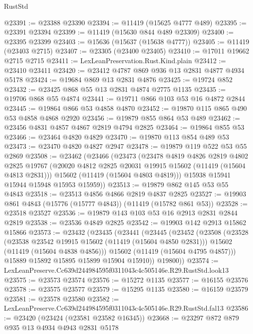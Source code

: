 \begin{lexlean}{RustStd}
\begin{coremodule}
@23391 := @23388 @23390
@23394 := @11419 (@15625 @4777 @489)
@23395 := @23391 @23394
@23399 := @11419 (@15630 @844 @489 @23309)
@23400 := @23395 @23399
@23403 := @15636 (@15637 (@15638 @4777))
@23405 := @11419 (@23403 @2715)
@23407 := @23305 (@23400 @23405)
@23410 := @17011 @19662 @2715 @2715
@23411 := LexLeanPreservation.Rust.Kind.plain
@23412 := @23410 @23411
@23420 := @23412 @4787 @869 @936 @13 @2831 @4877 @4934 @5178
@23424 := @19684 @869 @13 @2831 @4876
@23425 := @19724 @852
@23432 := @23425 @868 @55 @13 @2831 @4874 @2775 @1135
@23435 := @19706 @868 @55 @4874
@23441 := @19711 @866 @103 @53 @16 @4872 @2844
@23445 := @19864 @866 @53 @4858 @4870
@23452 := @19870 @115 @865 @490 @53 @4858 @4868 @2920
@23456 := @19879 @855 @864 @53 @489
@23462 := @23456 @4831 @4857 @4867 @2819 @4794 @2825
@23464 := @19864 @855 @53
@23466 := @23464 @4820 @4829
@23470 := @19870 @113 @854 @489 @53
@23473 := @23470 @4820 @4827 @2947
@23478 := @19879 @119 @522 @53 @55 @2869
@23508 := @23462
    (@23466
      (@23473
        (@23478
          @4819
          @4826
          @2819
          @4802
          @2825
          @19767
          (@20020 @4812 @2825 @20031 @19915 @15602 (@11419 (@15604 @4813 @2831)))
          @15602
          (@11419 (@15604 @4803 @4819)))
        @15938
        @15941
        @15944
        @15948
        @15953
        @15959))
@23513 := @19879 @862 @145 @53 @55 @4843
@23518 := @23513 @4856 @4866 @2819 @4837 @2825
@23527 := @19903 @861 @4843 (@15776 (@15777 @4843)) (@11419 (@15782 @861 @53))
@23528 := @23518 @23527
@23536 := @19879 @143 @103 @53 @16 @2913 @2831 @2844 @2819
@23538 := @23536 @4849 @2825
@23542 := @19903 @142 @2913 @15862 @15866
@23573 := @23432
    (@23435
      (@23441
        (@23445
          (@23452
            (@23508
              (@23528
                (@23538 @23542 @19915 @15602 (@11419 (@15604 @4850 @2831)))
                @15602
                (@11419 (@15604 @4838 @4856)))
              @15602
              (@11419 (@15604 @4795 @4857)))
            @15889
            @15892
            @15895
            @15899
            @15904
            @15910))
        @19800))
@23574 := LexLeanPreserve.Cc639d244984595f0311043c4c505146e.R29.RustStd.look13
@23575 := @23573 @23574
@23576 := @15272 @1135
@23577 := @16155 @23576
@23578 := @23575 @23577
@23579 := @15295 @1135
@23580 := @16159 @23579
@23581 := @23578 @23580
@23582 := LexLeanPreserve.Cc639d244984595f0311043c4c505146e.R29.RustStd.fal13
@23586 := @23420 (@23424 (@23581 @23582 @16345))
@23668 := @23297
    @872
    @879
    @935
    @13
    @4934
    @4943
    @2831
    @5178

\end{coremodule}
\end{lexlean}
